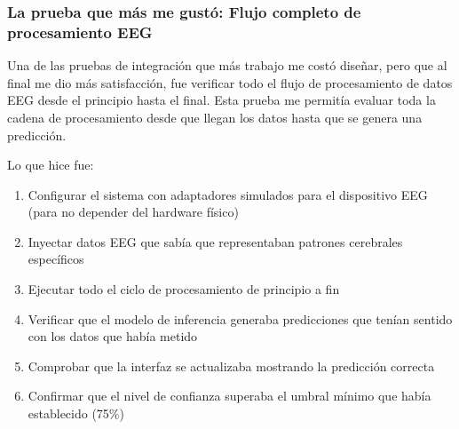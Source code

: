 \begin{table}[ht]
    \centering
    \small
    \caption{Resultados de pruebas de integración}
    \label{tab:integration_tests}
\end{table}

\subsubsection{La prueba que más me gustó: Flujo completo de procesamiento EEG}

Una de las pruebas de integración que más trabajo me costó diseñar, pero que al final me dio más satisfacción, fue verificar todo el flujo de procesamiento de datos EEG desde el principio hasta el final. Esta prueba me permitía evaluar toda la cadena de procesamiento desde que llegan los datos hasta que se genera una predicción.

Lo que hice fue:
\begin{enumerate}
    \item Configurar el sistema con adaptadores simulados para el dispositivo EEG (para no depender del hardware físico)
    \item Inyectar datos EEG que sabía que representaban patrones cerebrales específicos
    \item Ejecutar todo el ciclo de procesamiento de principio a fin
    \item Verificar que el modelo de inferencia generaba predicciones que tenían sentido con los datos que había metido
    \item Comprobar que la interfaz se actualizaba mostrando la predicción correcta
    \item Confirmar que el nivel de confianza superaba el umbral mínimo que había establecido (75\%)
\end{enumerate}

